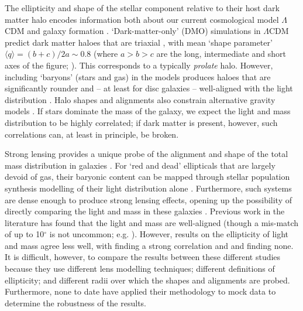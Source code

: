 \documentclass[useAMS,usenatbib]{mn2e}
\begin{document}
The ellipticity and shape of the stellar component relative to their host dark matter halo encodes information both about our current cosmological model $\Lambda$CDM and galaxy formation \citep[e.g.][]{1994ApJ...431..617D,2001ApJ...551..294I,2004ApJ...611L..73K,2007MNRAS.378...55M,2007arXiv0707.0737D,2012MNRAS.424L..16L,2014JPhG...41f3101R}. `Dark-matter-only' (DMO) simulations in $\Lambda$CDM predict dark matter haloes that are triaxial \citep{1991ApJ...378..496D,1992ApJ...399..405W,1996ApJ...462..563N,2002ApJ...574..538J}, with mean `shape parameter' $\langle q \rangle = (b+c)/2a \sim 0.8$ (where $a > b > c$ are the long, intermediate and short axes of the figure; \citealt{2007MNRAS.378...55M}). This corresponds to a typically {\it prolate} halo. However, including `baryons' (stars and gas) in the models produces haloes that are significantly rounder and -- at least for disc galaxies -- well-aligned with the light distribution \citep{1991ApJ...377..365K,1994ApJ...431..617D,2007arXiv0707.0737D}. Halo shapes and alignments also constrain alternative gravity models \citep{2001MNRAS.327..552M,2004ApJ...610L..97H,2005MNRAS.361..971R,2012PhRvD..86h3507F,2013MNRAS.434.2971D}. If stars dominate the mass of the galaxy, we expect the light and mass distribution to be highly correlated; if dark matter is present, however, such correlations can, at least in principle, be broken.

Strong lensing provides a unique probe of the alignment and shape of the total mass distribution in galaxies \citep[e.g.][]{1986ApJ...310..568B,1992grle.book.....S,1998ApJ...509..561K,2000ApJ...543..131K,2006ApJ...649..599K,2007AJ....134..668A,2008MNRAS.383..857F,2010ApJ...724..511A,2012MNRAS.424..104L}. For `red and dead' ellipticals that are largely devoid of gas, their baryonic content can be mapped through stellar population synthesis modelling of their light distribution alone \citep[e.g.][]{2005ApJ...623L...5F,2006ApJ...640..662T,2008MNRAS.383..857F}. Furthermore, such systems are dense enough to produce strong lensing effects, opening up the possibility of directly comparing the light and mass in these galaxies \citep{1998ApJ...509..561K,2008MNRAS.383..857F,2009ApJ...690..670T,2012A&A...538A..99S}. Previous work in the literature has found that the light and mass are well-aligned (though a mis-match of up to 10$^\circ$ is not uncommon; e.g. \citealt{2012A&A...538A..99S}). However, results on the ellipticity of light and mass agree less well, with \citet{2012A&A...538A..99S} finding a strong correlation and \citet{1998ApJ...509..561K} and \citet{2008MNRAS.383..857F} finding none. It is difficult, however, to compare the results between these different studies because they use different lens modelling techniques; different definitions of ellipticity; and different radii over which the shapes and alignments are probed. Furthermore, none to date have applied their methodology to mock data to determine the robustness of the results.
\end{document}

